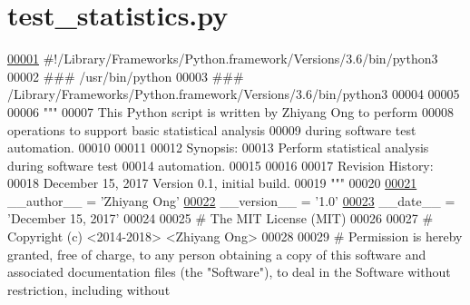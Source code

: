 \hypertarget{test__statistics_8py_source}{}\section{test\+\_\+statistics.\+py}
\label{test__statistics_8py_source}

\begin{DoxyCode}
\hypertarget{test__statistics_8py_source_l00001}{}\hyperlink{namespacestatistics_1_1test__statistics}{00001} \textcolor{comment}{#!/Library/Frameworks/Python.framework/Versions/3.6/bin/python3}
00002 \textcolor{comment}{### /usr/bin/python}
00003 \textcolor{comment}{### /Library/Frameworks/Python.framework/Versions/3.6/bin/python3}
00004 
00005 
00006 \textcolor{stringliteral}{"""}
00007 \textcolor{stringliteral}{    This Python script is written by Zhiyang Ong to perform}
00008 \textcolor{stringliteral}{        operations to support basic statistical analysis}
00009 \textcolor{stringliteral}{        during software test automation.}
00010 \textcolor{stringliteral}{}
00011 \textcolor{stringliteral}{}
00012 \textcolor{stringliteral}{    Synopsis:}
00013 \textcolor{stringliteral}{    Perform statistical analysis during software test}
00014 \textcolor{stringliteral}{        automation.}
00015 \textcolor{stringliteral}{}
00016 \textcolor{stringliteral}{}
00017 \textcolor{stringliteral}{    Revision History:}
00018 \textcolor{stringliteral}{    December 15, 2017           Version 0.1, initial build.}
00019 \textcolor{stringliteral}{"""}
00020 
\hypertarget{test__statistics_8py_source_l00021}{}\hyperlink{namespacestatistics_1_1test__statistics_a188ace18635f13c413bf14347b4eb7f0}{00021} \_\_author\_\_ = \textcolor{stringliteral}{'Zhiyang Ong'}
\hypertarget{test__statistics_8py_source_l00022}{}\hyperlink{namespacestatistics_1_1test__statistics_ad5c236202b813efcbc877e38a20d7f07}{00022} \_\_version\_\_ = \textcolor{stringliteral}{'1.0'}
\hypertarget{test__statistics_8py_source_l00023}{}\hyperlink{namespacestatistics_1_1test__statistics_a271285b175d250f7888c9b41fa124abd}{00023} \_\_date\_\_ = \textcolor{stringliteral}{'December 15, 2017'}
00024 
00025 \textcolor{comment}{#   The MIT License (MIT)}
00026 
00027 \textcolor{comment}{#   Copyright (c) <2014-2018> <Zhiyang Ong>}
00028 
00029 \textcolor{comment}{#   Permission is hereby granted, free of charge, to any person obtaining a copy of this software and
       associated documentation files (the "Software"), to deal in the Software without restriction, including without
}
\end{DoxyCode}
